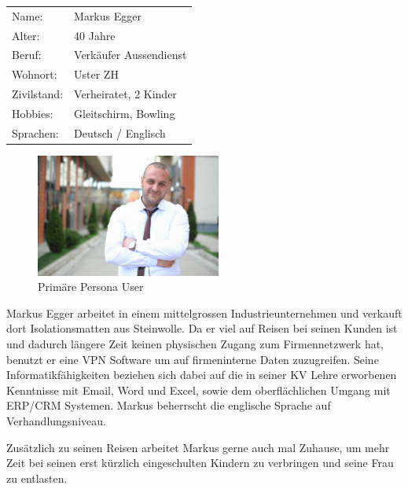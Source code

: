 \noindent\begin{minipage}[t]{0.5\textwidth}
\vspace{0pt}
    \begin{tabular}{ l l }
        Name: & Markus Egger \\
        Alter: & 40 Jahre \\
        Beruf: & Verkäufer Aussendienst \\
        Wohnort: & Uster ZH \\
        Zivilstand: & Verheiratet, 2 Kinder \\
        Hobbies: & Gleitschirm, Bowling \\
        Sprachen: & Deutsch / Englisch \\
    \end{tabular}
\end{minipage}
\hfill
\begin{minipage}[t]{0.5\textwidth}
\vspace{0pt}

\begin{figure}[H]
\centering
    \includegraphics[width=230px]{images/persona_business.jpg}
    \caption[Primäre Persona User]{Primäre Persona User}
\end{figure}
\end{minipage}
\medskip


Markus Egger arbeitet in einem mittelgrossen Industrieunternehmen und verkauft dort Isolationsmatten aus Steinwolle. Da er viel auf Reisen bei seinen Kunden ist und dadurch längere Zeit keinen physischen Zugang zum Firmennetzwerk hat, benutzt er eine VPN Software um auf firmeninterne Daten zuzugreifen. Seine Informatikfähigkeiten beziehen sich dabei auf die in seiner KV Lehre erworbenen Kenntnisse mit Email, Word und Excel, sowie dem oberflächlichen Umgang mit ERP/CRM Systemen.
Markus beherrscht die englische Sprache auf Verhandlungsniveau.

Zusätzlich zu seinen Reisen arbeitet Markus gerne auch mal Zuhause, um mehr Zeit bei seinen erst kürzlich eingeschulten Kindern zu verbringen und seine Frau zu entlasten.

